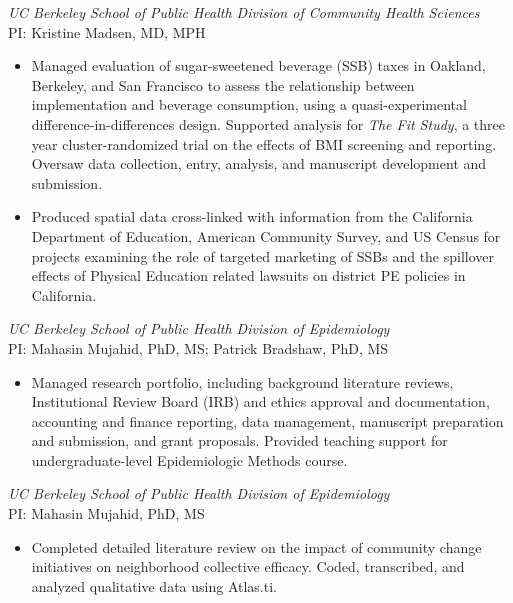 \documentclass{cv_style}
\begin{document}
\textit{UC Berkeley School of Public Health Division of Community Health Sciences} \\
PI: Kristine Madsen, MD, MPH
\begin{itemize}
    \item Managed evaluation of sugar-sweetened beverage (SSB) taxes in Oakland, Berkeley, and San Francisco to assess the relationship between implementation and beverage consumption, using a quasi-experimental difference-in-differences design. Supported analysis for \textit{The Fit Study}, a three year cluster-randomized trial on the effects of BMI screening and reporting. Oversaw data collection, entry, analysis, and manuscript development and submission.
    \item \parskip 1pt Produced spatial data cross-linked with information from the California Department of Education, American Community Survey, and US Census for projects examining the role of targeted marketing of SSBs and the spillover effects of Physical Education related lawsuits on district PE policies in California.
\end{itemize}

\textit{UC Berkeley School of Public Health Division of Epidemiology} \\
PI: Mahasin Mujahid, PhD, MS; Patrick Bradshaw, PhD, MS
\begin{itemize}
    \item Managed research portfolio, including background literature reviews, Institutional Review Board (IRB) and ethics approval and documentation, accounting and finance reporting, data management, manuscript preparation and submission, and grant proposals. Provided teaching support for undergraduate-level Epidemiologic Methods course.
\end{itemize}

\textit{UC Berkeley School of Public Health Division of Epidemiology} \\
PI: Mahasin Mujahid, PhD, MS
\begin{itemize}
    \item Completed detailed literature review on the impact of community change initiatives on neighborhood collective efficacy. Coded, transcribed, and analyzed qualitative data using Atlas.ti.
\end{itemize}
\end{document}
